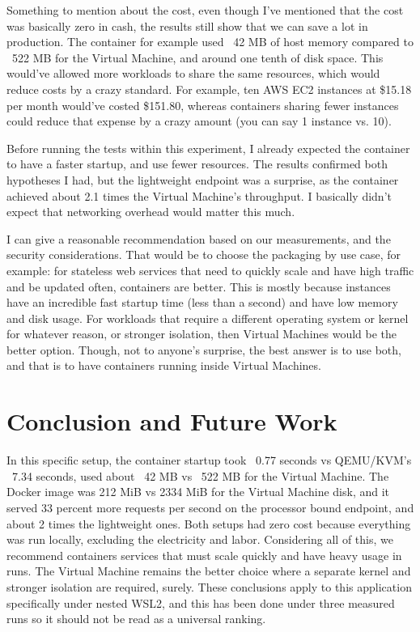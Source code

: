\documentclass[conference,a4paper]{IEEEtran}
\begin{document}
Something to mention about the cost, even though I’ve mentioned that the cost was basically zero in cash, the results still show that we can save a lot in production. The container for example used ~42 MB of host memory compared to ~522 MB for the Virtual Machine, and around one tenth of disk space. This would’ve allowed more workloads to share the same resources, which would reduce costs by a crazy standard. For example, ten AWS EC2 instances at \$15.18 per month would’ve costed \$151.80, whereas containers sharing fewer instances could reduce that expense by a crazy amount (you can say 1 instance vs. 10).

Before running the tests within this experiment, I already expected the container to have a faster startup, and use fewer resources. The results confirmed both hypotheses I had, but the lightweight endpoint was a surprise, as the container achieved about 2.1 times the Virtual Machine’s throughput. I basically didn’t expect that networking overhead would matter this much.

I can give a reasonable recommendation based on our measurements, and the security considerations. That would be to choose the packaging by use case, for example: for stateless web services that need to quickly scale and have high traffic and be updated often, containers are better. This is mostly because instances have an incredible fast startup time (less than a second) and have low memory and disk usage. For workloads that require a different operating system or kernel for whatever reason, or stronger isolation, then Virtual Machines would be the better option. Though, not to anyone’s surprise, the best answer is to use both, and that is to have containers running inside Virtual Machines.

\section{Conclusion and Future Work}
\label{sec:conclusion}
In this specific setup, the container startup took ~0.77 seconds vs QEMU/KVM’s ~7.34 seconds, used about ~42 MB vs ~522 MB for the Virtual Machine. The Docker image was 212 MiB vs 2334 MiB for the Virtual Machine disk, and it served 33 percent more requests per second on the processor bound endpoint, and about 2 times the lightweight ones. Both setups had zero cost because everything was run locally, excluding the electricity and labor. Considering all of this, we recommend containers services that must scale quickly and have heavy usage in runs. The Virtual Machine remains the better choice where a separate kernel and stronger isolation are required, surely. These conclusions apply to this application specifically under nested WSL2, and this has been done under three measured runs so it should not be read as a universal ranking.
\end{document}
